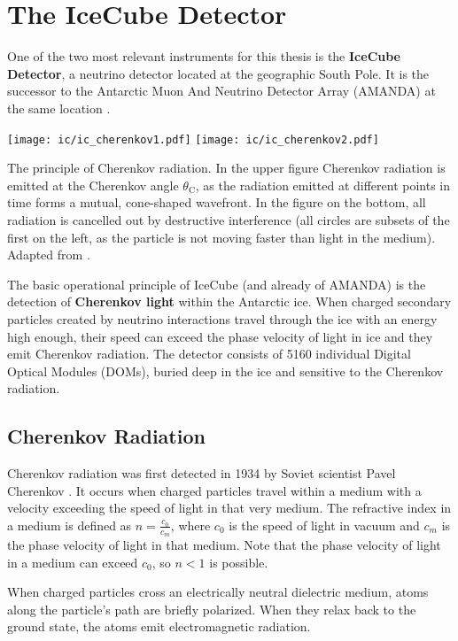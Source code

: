 \chapter{The IceCube Detector} \label{ic}
One of the two most relevant instruments for this thesis is the \textbf{IceCube Detector}, a neutrino detector located at the geographic South Pole. It is the successor to the Antarctic Muon And Neutrino Detector Array (AMANDA) at the same location .
\begin{marginfigure}
    \texttt{[image: ic/ic\_cherenkov1.pdf]}
    \texttt{[image: ic/ic\_cherenkov2.pdf]}
    \caption[Cherenkov radiation]{The principle of Cherenkov radiation. In the upper figure Cherenkov radiation is emitted at the Cherenkov angle $\theta_\text{C}$, as the radiation emitted at different points in time forms a mutual, cone-shaped wavefront. In the figure on the bottom, all radiation is cancelled out by destructive interference (all circles are subsets of the first on the left, as the particle is not moving faster than light in the medium). Adapted from \cite{LAnnunziata2020}.}
\end{marginfigure}
The basic operational principle of IceCube (and already of AMANDA) is the detection of \textbf{Cherenkov light} within the Antarctic ice. When charged secondary particles created by neutrino interactions travel through the ice with an energy high enough, their speed can exceed the phase velocity of light in ice and they emit Cherenkov radiation. The detector consists of 5160 individual Digital Optical Modules (DOMs), buried deep in the ice and sensitive to the Cherenkov radiation.

\section{Cherenkov Radiation} \label{cherenkov_radiation}

Cherenkov radiation was first detected in 1934 by Soviet scientist Pavel Cherenkov . It occurs when charged particles travel within a medium with a velocity exceeding the speed of light in that very medium. The refractive index in a medium is defined as $n=\frac{c_0}{c_m}$, where $c_0$ is the speed of light in vacuum and $c_m$ is the phase velocity of light in that medium. Note that the phase velocity of light in a medium can exceed $c_0$, so $n<1$ is possible. 

When charged particles cross an electrically neutral dielectric medium, atoms along the particle's path are briefly polarized. When they relax back to the ground state, the atoms emit electromagnetic radiation.

